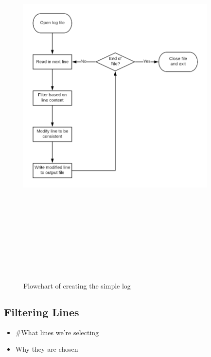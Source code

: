 \begin{figure}
    \begin{centering}
        \includegraphics[width=10cm,height=20cm,keepaspectratio]{Figures/Chapter5-SimpleLogFlowchart.png}
        \caption{Flowchart of creating the simple log}
        \label{fig:chapter5SimpleFlowchart}
    \end{centering}
\end{figure}

\subsection{Filtering Lines}\label{filteringLines}
\begin{itemize}
    \item \#What lines we're selecting
    \item Why they are chosen
\end{itemize}

